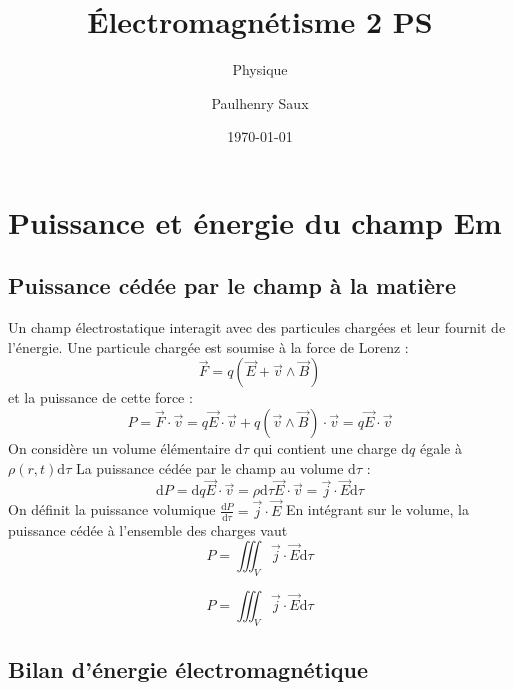 \documentclass[french]{yLectureNote}
\title{Électromagnétisme 2 PS}
\subtitle{Physique}
\author{Paulhenry Saux}
\date{\today}
\renewcommand{\vec}{\overrightarrow}
\newcommand{\dd}{\mathrm{d}}
\begin{document}
\chapter{Puissance et énergie du champ Em}
\section{Puissance cédée par le champ  à la matière}
Un champ électrostatique interagit avec des particules chargées et leur fournit de l'énergie.
Une particule chargée est soumise à la force de Lorenz :
$$\vec{F} = q(\vec{E}+\vec{v}\wedge \vec{B})$$ et la puissance de cette force :
$$P = \vec{F}\cdot \vec{v} = q\vec{E}\cdot \vec{v}+q(\vec{v}\wedge \vec{B})\cdot \vec{v} = q\vec{E}\cdot \vec{v}$$
On considère un volume élémentaire $\dd \tau$ qui contient une charge $\dd q$ égale à $ \rho(r,t) \dd \tau$
La puissance cédée par le champ au volume $\dd \tau$ :
$$\dd P = \dd q \vec{E}\cdot \vec{v} = \rho \dd \tau \vec{E}\cdot \vec{v} = \vec{j}\cdot \vec{E}\dd \tau$$
On définit la puissance volumique $\frac{\dd P}{\dd \tau} = \vec{j}\cdot \vec{E}$
En intégrant sur le volume, la puissance cédée à l'ensemble des charges vaut $$P = \iiint_{V} \vec{j}\cdot \vec{E}\dd \tau$$
\begin{theorem}
    $$P = \iiint_{V} \vec{j}\cdot \vec{E}\dd \tau$$
\end{theorem}
\section{Bilan d'énergie électromagnétique}
\end{document}
